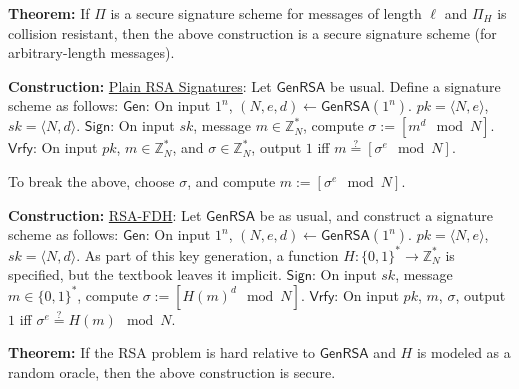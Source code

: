 \documentclass[10pt]{article}
\newcommand{\Z}{\mathbb{Z}}
\newcommand{\thm}[1]{{\bf Theorem:} \underline{#1}}
\newcommand{\con}[1]{{\bf Construction:} \underline{#1}}
\newcommand{\Sign}{\mathsf{Sign}}
\newcommand{\Vrfy}{\mathsf{Vrfy}}
\newcommand{\Gen}{\mathsf{Gen}}
\newcommand{\GenRSA}{\mathsf{GenRSA}}
\newcommand{\ang}[1]{\langle#1\rangle}
\newcommand{\from}{\leftarrow}
\begin{document}
\begin{multicols}{3}
\thm{}If $\Pi$ is a secure signature scheme for messages of length $\ell$ and $\Pi_H$ is collision resistant, then the above construction is a secure signature scheme (for arbitrary-length messages).

\con{Plain RSA Signatures}: Let $\GenRSA$ be usual. Define a signature scheme as follows: $\Gen$: On input $1^n$, $(N,e,d)\from\GenRSA(1^n)$. $pk=\ang{N,e}$, $sk=\ang{N,d}$. $\Sign$: On input $sk$, message $m\in\Z_N^*$, compute $\sigma:=[m^d\mod{N}]$. $\Vrfy$: On input $pk$, $m\in\Z_N^*$, and $\sigma\in\Z_N^*$, output $1$ iff $m\overset{?}{=}[\sigma^e\mod{N}]$.

To break the above, choose $\sigma$, and compute $m:=[\sigma^e\mod{N}]$.

\con{RSA-FDH}: Let $\GenRSA$ be as usual, and construct a signature scheme as follows: $\Gen$: On input $1^n$, $(N,e,d)\from\GenRSA(1^n)$. $pk=\ang{N,e}$, $sk=\ang{N,d}$. As part of this key generation, a function $H:\{0,1\}^*\to\Z_N^*$ is specified, but the textbook leaves it implicit. $\Sign$: On input $sk$, message $m\in\{0,1\}^*$, compute $\sigma:=[H(m)^d\mod{N}]$. $\Vrfy$: On input $pk$, $m$, $\sigma$, output $1$ iff $\sigma^e\overset{?}{=}H(m)\mod{N}$.

\thm{} If the RSA problem is hard relative to $\GenRSA$ and $H$ is modeled as a random oracle, then the above construction is secure.

\end{multicols}
\end{document}
